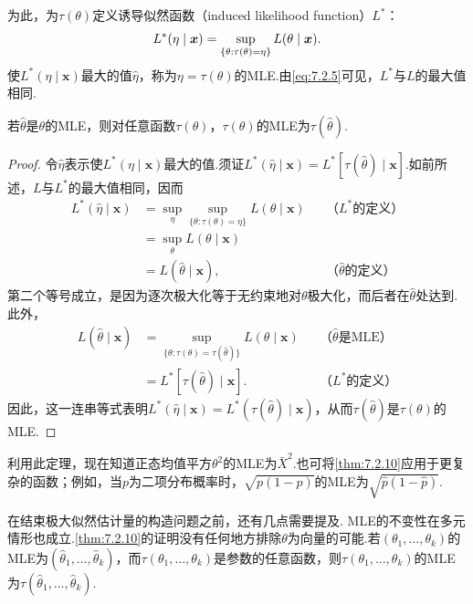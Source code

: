 为此，为$\tau(\theta)$定义诱导似然函数（induced likelihood function）$L^*$：
\begin{equation}\label{eq:7.2.5}\index{SI0620@诱导}
L^*(\eta\mid\boldsymbol x)=\sup_{\{\theta:\tau(\theta)=\eta\}}L(\theta\mid\boldsymbol x).
\end{equation}
使$L^*(\eta\mid\boldsymbol x)$最大的值$\widehat\eta$，称为$\eta=\tau(\theta)$的MLE.由\eqref{eq:7.2.5}可见，$L^*$与$L$的最大值相同.
\begin{theorem}[MLE的不变性]\label{thm:7.2.10}
若$\widehat\theta$是$\theta$的MLE，则对任意函数$\tau(\theta)$，$\tau(\theta)$的MLE为$\tau(\widehat\theta)$.
\end{theorem}
\begin{proof}
令$\widehat\eta$表示使$L^*(\eta\mid\boldsymbol x)$最大的值.须证$L^*(\widehat\eta\mid\boldsymbol x)=L^*[\tau(\widehat\theta)\mid\boldsymbol x]$.如前所述，$L$与$L^*$的最大值相同，因而
\begin{align*}
L^*(\widehat\eta\mid\boldsymbol x)&=\sup_\eta\sup_{\{\theta:\tau(\theta)=\eta\}}L(\theta\mid\boldsymbol x)&&\text{（$L^*$的定义）}\\
&=\sup_\theta L(\theta\mid\boldsymbol x)\\
&=L(\widehat\theta\mid\boldsymbol x),&&\text{（$\widehat\theta$的定义）}
\end{align*}
第二个等号成立，是因为逐次极大化等于无约束地对$\theta$极大化，而后者在$\widehat\theta$处达到.此外，
\begin{align*}
L(\widehat\theta\mid\boldsymbol x)&=\sup_{\{\theta:\tau(\theta)=\tau(\widehat\theta)\}}L(\theta\mid\boldsymbol x)&&\text{（$\widehat\theta$是MLE）}\\
&=L^*[\tau(\widehat\theta)\mid\boldsymbol x].&&\text{（$L^*$的定义）}
\end{align*}
因此，这一连串等式表明$L^*(\widehat\eta\mid\boldsymbol x)=L^*(\tau(\widehat\theta)\mid\boldsymbol x)$，从而$\tau(\widehat\theta)$是$\tau(\theta)$的MLE.
\end{proof}
利用此定理，现在知道正态均值平方$\theta^2$的MLE为$\bar X^2$.也可将\autoref{thm:7.2.10}应用于更复杂的函数；例如，当$p$为二项分布概率时，$\sqrt{p(1-p)}$的MLE为$\sqrt{\widehat p(1-\widehat p)}$.

在结束极大似然估计量的构造问题之前，还有几点需要提及.
MLE的不变性在多元情形也成立.\autoref{thm:7.2.10}的证明没有任何地方排除$\theta$为向量的可能.若$(\theta_1,\ldots,\theta_k)$的MLE为$(\widehat\theta_1,\ldots,\widehat\theta_k)$，而$\tau(\theta_1,\ldots,\theta_k)$是参数的任意函数，则$\tau(\theta_1,\ldots,\theta_k)$的MLE为$\tau(\widehat\theta_1,\ldots,\widehat\theta_k)$.

